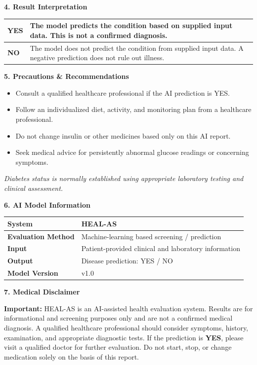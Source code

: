 \documentclass[11pt,a4paper]{article}
\newcommand{\sectiontitle}[1]{\vspace{8pt}\noindent\colorbox{HealBlue}{\parbox{\dimexpr\linewidth-2\fboxsep}{\color{white}\textbf{\large #1}}}\vspace{5pt}}
\begin{document}
\sectiontitle{4. Result Interpretation}
\begin{tabularx}{\linewidth}{|p{2cm}|X|}
\hline
\textbf{\color{HealRed}YES} & The model predicts the condition based on supplied input data. This is not a confirmed diagnosis.\\ \hline
\textbf{\color{HealGreen}NO} & The model does not predict the condition from supplied input data. A negative prediction does not rule out illness.\\ \hline
\end{tabularx}

\sectiontitle{5. Precautions \& Recommendations}
\begin{tcolorbox}[colback=white,colframe=HealRed]
\begin{itemize}[leftmargin=1.2cm]
\item Consult a qualified healthcare professional if the AI prediction is YES.
\item Follow an individualized diet, activity, and monitoring plan from a healthcare professional.
\item Do not change insulin or other medicines based only on this AI report.
\item Seek medical advice for persistently abnormal glucose readings or concerning symptoms.
\end{itemize}
\end{tcolorbox}

\textit{Diabetes status is normally established using appropriate laboratory testing and clinical assessment.}

\sectiontitle{6. AI Model Information}
\begin{tabularx}{\linewidth}{|l|X|}
\hline \textbf{System} & HEAL-AS \\ \hline
\textbf{Evaluation Method} & Machine-learning based screening / prediction \\ \hline
\textbf{Input} & Patient-provided clinical and laboratory information \\ \hline
\textbf{Output} & Disease prediction: YES / NO \\ \hline
\textbf{Model Version} & v1.0 \\ \hline
\end{tabularx}

\sectiontitle{7. Medical Disclaimer}
\begin{tcolorbox}[colback=HealLight,colframe=HealBlue]
\textbf{Important:} HEAL-AS is an AI-assisted health evaluation system. Results are for informational and screening purposes only and are not a confirmed medical diagnosis. A qualified healthcare professional should consider symptoms, history, examination, and appropriate diagnostic tests. If the prediction is \textbf{YES}, please visit a qualified doctor for further evaluation. Do not start, stop, or change medication solely on the basis of this report.
\end{tcolorbox}
\end{document}
